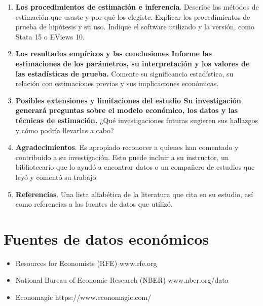\begin{enumerate}[\bfseries 1.]
    \item \textbf{Los procedimientos de estimación e inferencia}. Describe los métodos de estimación que usaste y por qué los elegiste. Explicar los procedimientos de prueba de hipótesis y su uso. Indique el software utilizado y la versión, como Stata 15 o EViews 10. 
    \item \textbf{Los resultados empíricos y las conclusiones Informe las estimaciones de los parámetros, su interpretación y los valores de las estadísticas de prueba.} Comente su significancia estadística, su relación con estimaciones previas y sus implicaciones económicas. 
    \item \textbf{Posibles extensiones y limitaciones del estudio Su investigación generará preguntas sobre el modelo económico, los datos y las técnicas de estimación.} ¿Qué investigaciones futuras sugieren sus hallazgos y cómo podría llevarlas a cabo? 
    \item \textbf{Agradecimientos}. Es apropiado reconocer a quienes han comentado y contribuido a su investigación. Esto puede incluir a su instructor, un bibliotecario que lo ayudó a encontrar datos o un compañero de estudios que leyó y comentó su trabajo. 
    \item \textbf{Referencias}. Una lista alfabética de la literatura que cita en su estudio, así como referencias a las fuentes de datos que utilizó.
\end{enumerate}

\section{Fuentes de datos económicos}
\begin{itemize}
    \item Resources for Economists (RFE) www.rfe.org
    \item National Bureau of Economic Research (NBER) www.nber.org/data
    \item Economagic https://www.economagic.com/
\end{itemize}
